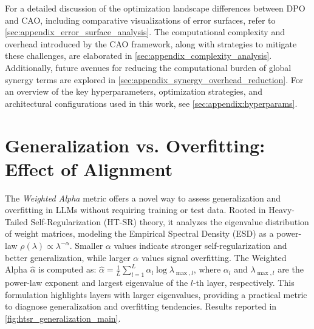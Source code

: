 For a detailed discussion of the optimization landscape differences between DPO and CAO, including comparative visualizations of error surfaces, refer to \cref{sec:appendix_error_surface_analysis}. The computational complexity and overhead introduced by the CAO framework, along with strategies to mitigate these challenges, are elaborated in \cref{sec:appendix_complexity_analysis}. Additionally, future avenues for reducing the computational burden of global synergy terms are explored in \cref{sec:appendix_synergy_overhead_reduction}. For an overview of the key hyperparameters, optimization strategies, and architectural configurations used in this work, see \cref{sec:appendix:hyperparams}.








\section{Generalization vs. Overfitting: Effect of Alignment}
\label{sec:HTSR_generalization}

The \textit{Weighted Alpha} metric \cite{martin2021predicting} offers a novel way to assess generalization and overfitting in LLMs without requiring training or test data. Rooted in Heavy-Tailed Self-Regularization (HT-SR) theory, it analyzes the eigenvalue distribution of weight matrices, modeling the Empirical Spectral Density (ESD) as a power-law \(\rho(\lambda) \propto \lambda^{-\alpha}\). Smaller \(\alpha\) values indicate stronger self-regularization and better generalization, while larger \(\alpha\) values signal overfitting. The Weighted Alpha \(\hat{\alpha}\) is computed as:
$\hat{\alpha} = \frac{1}{L} \sum_{l=1}^L \alpha_l \log \lambda_{\max,l}$,
where \(\alpha_l\) and \(\lambda_{\max,l}\) are the power-law exponent and largest eigenvalue of the \(l\)-th layer, respectively. This formulation highlights layers with larger eigenvalues, providing a practical metric to diagnose generalization and overfitting tendencies. Results reported in \cref{fig:htsr_generalization_main}.




